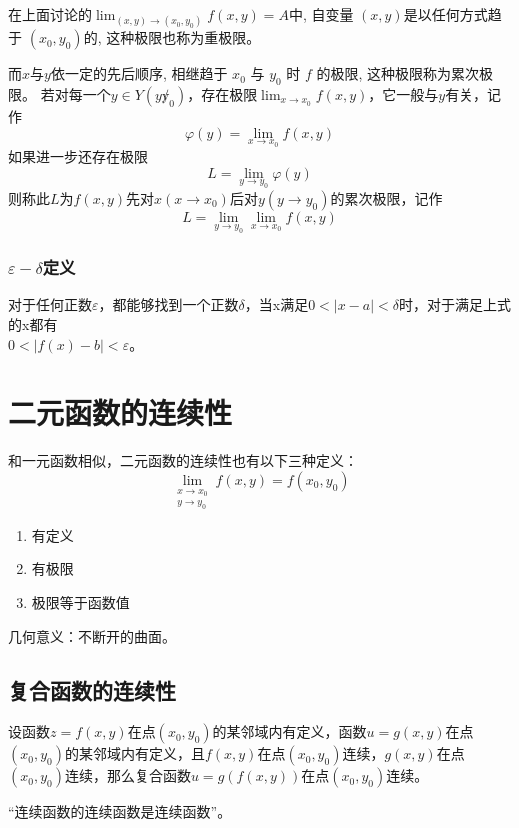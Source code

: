 在上面讨论的$\lim_{(x,y)\to(x_0,y_0)}f(x,y)=A$中, 自变量 $(x, y)$是以任何方式趋于 $(x_0, y_0)$的, 这种极限也称为重极限。

而$x$与$y$依一定的先后顺序, 相继趋于 $x_0$ 与 $y_0$ 时 $f$ 的极限, 这种极限称为累次极限。
若对每一个$y\in Y(y\not y_0)$，存在极限$\lim_{x\to x_0}f(x,y)$，它一般与$y$有关，记作
$$\varphi(y)=\lim_{x\to x_0}f(x,y)$$
如果进一步还存在极限
$$L=\lim_{y\to y_0}\varphi(y)$$
则称此$L$为$f(x,y)$先对$x(x\to x_0)$后对$y(y\to y_0)$的累次极限，记作
$$L=\lim_{y\to y_0}\lim_{x\to x_0}f(x,y)$$

{}

\subsubsection{$\varepsilon-\delta$定义}

对于任何正数$\varepsilon$，都能够找到一个正数$\delta$，当x满足${0<\mid x-a\mid <\delta }$时，对于满足上式的x都有\\ ${0<\mid f(x)-b\mid <\varepsilon }$。

\section{二元函数的连续性}

和一元函数相似，二元函数的连续性也有以下三种定义：
$$\lim_{ \substack{x\to x_0 \\ y\to y_0} }f(x,y)=f(x_0,y_0)$$%
\begin{enumerate}
    \item 有定义
    \item 有极限
    \item 极限等于函数值
\end{enumerate}
几何意义：不断开的曲面。

\subsection{复合函数的连续性}

设函数$z=f(x,y)$在点$(x_0,y_0)$的某邻域内有定义，函数$u=g(x,y)$在点$(x_0,y_0)$的某邻域内有定义，且$f(x,y)$在点$(x_0,y_0)$连续，$g(x,y)$在点$(x_0,y_0)$连续，那么复合函数$u=g(f(x,y))$在点$(x_0,y_0)$连续。

“连续函数的连续函数是连续函数”。